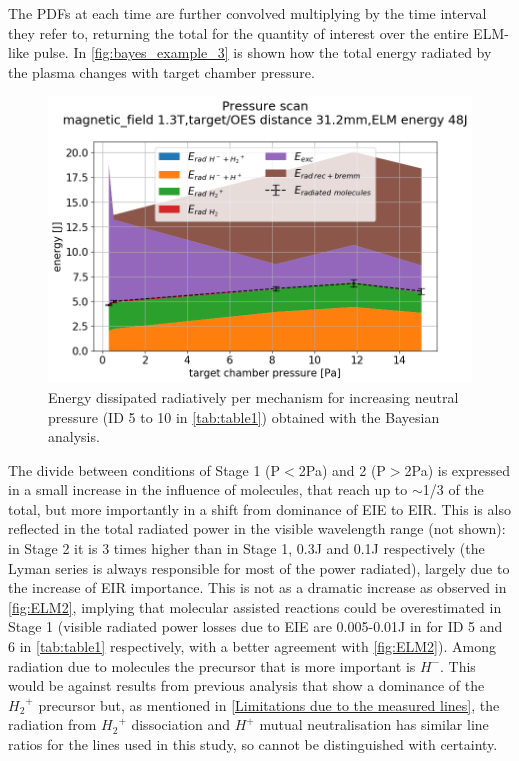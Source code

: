 The PDFs at each time are further convolved multiplying by the time interval they refer to, returning the total for the quantity of interest over the entire ELM-like pulse. In \autoref{fig:bayes_example_3} is shown how the total energy radiated by the plasma changes with target chamber pressure.
\begin{figure}[!ht]
	\centering
	\includegraphics[width=0.7\linewidth,trim={0 0 30 60},clip]{Chapters/chapter3/figs/Bayesian_strong_4.png}
	\caption{Energy dissipated radiatively per mechanism for increasing neutral pressure (ID 5 to 10 in \autoref{tab:table1}) obtained with the Bayesian analysis.}
	\label{fig:bayes_example_3}
\end{figure}
The divide between conditions of Stage 1 (P$<$2Pa) and 2 (P$>$2Pa) is expressed in a small increase in the influence of molecules, that reach up to $\sim$1/3 of the total, but more importantly in a shift from dominance of EIE to EIR. This is also reflected in the total radiated power in the visible wavelength range (not shown): in Stage 2 it is 3 times higher than in Stage 1, 0.3J and 0.1J respectively (the Lyman series is always responsible for most of the power radiated), largely due to the increase of EIR importance. This is not as a dramatic increase as observed in \autoref{fig:ELM2}, implying that molecular assisted reactions could be overestimated in Stage 1 (visible radiated power losses due to EIE are 0.005-0.01J in for ID 5 and 6 in \autoref{tab:table1} respectively, with a better agreement with \autoref{fig:ELM2}). Among radiation due to molecules the precursor that is more important is $H^-$. This would be against results from previous analysis that show a dominance of the ${H_2}^+$ precursor\cite{Akkermans2020} but, as mentioned in \autoref{Limitations due to the measured lines}, the radiation from ${H_2}^+$ dissociation and $H^+$ mutual neutralisation has similar line ratios for the lines used in this study, so cannot be distinguished with certainty.

